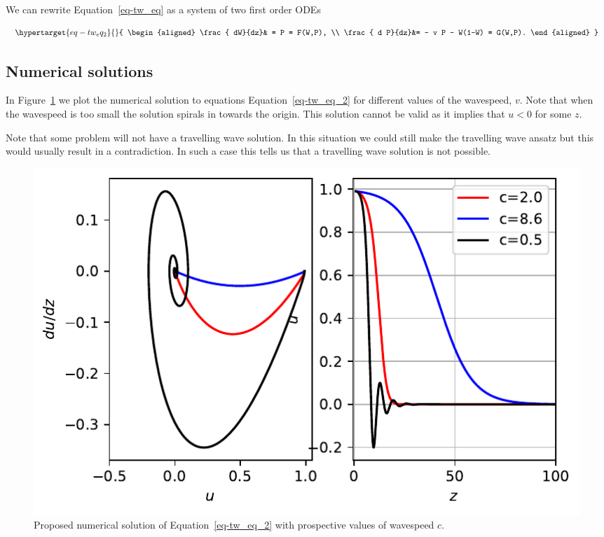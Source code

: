 \documentclass[
  letterpaper,
  DIV=11,
  numbers=noendperiod]{scrreprt}
\theoremstyle{plain}
\theoremstyle{definition}
\theoremstyle{plain}
\theoremstyle{remark}
\begin{document}
We can rewrite Equation~\ref{eq-tw_eq} as a system of two first order
ODEs

\begin{equation}\protect\hypertarget{eq-tw_eq_2}{}{
\begin{aligned}
\frac{ dW}{dz}& = P  = F(W,P), \\
\frac{ d P}{dz}&= -  v P - W(1-W)  = G(W,P).  
\end{aligned}
}\label{eq-tw_eq_2}\end{equation}

\hypertarget{numerical-solutions-1}{%
\subsection{Numerical solutions}\label{numerical-solutions-1}}

In Figure~\ref{fig-fishernumtravwave} we plot the numerical solution to
equations Equation~\ref{eq-tw_eq_2} for different values of the
wavespeed, \(v\). Note that when the wavespeed is too small the solution
spirals in towards the origin. This solution cannot be valid as it
implies that \(u<0\) for some \(z\).

Note that some problem will not have a travelling wave solution. In this
situation we could still make the travelling wave ansatz but this would
usually result in a contradiction. In such a case this tells us that a
travelling wave solution is not possible.

\begin{figure}

{\centering \includegraphics{nonlinearreactiondiffusion_files/figure-pdf/fig-fishernumtravwave-output-1.pdf}

}

\caption{\label{fig-fishernumtravwave}Proposed numerical solution of
Equation~\ref{eq-tw_eq_2} with prospective values of wavespeed \(c\).}

\end{figure}
\end{document}
